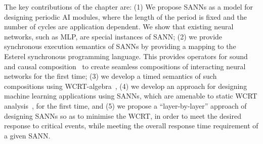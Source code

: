 The key contributions of the chapter are: (1) We propose \acfp{SANN} as a model for designing periodic 
AI modules, where the length of the period is fixed and the number of cycles are application dependent.
We show that existing neural networks, such as \ac{MLP}, are special instances of \ac{SANN};
(2) we provide synchronous execution semantics of \acp{SANN} by providing a mapping to the 
Esterel synchronous programming language. This provides operators for sound and causal composition~\cite{benveniste2003synchronous} to 
create seamless compositions of interacting neural networks for the first time; (3) we develop a 
timed semantics of such compositions using \ac{WCRT}-algebra~\cite{wang2017timing}, (4) we
 develop an approach for designing machine learning applications using \acp{SANN}, which are amenable to
  static \acf{WCRT} analysis~\cite{roop2009tight}, for the first time, and (5) we propose a ``layer-by-layer'' approach of 
 designing \acp{SANN} so as to minimise the \ac{WCRT}, in order to meet the desired response to 
critical events, while meeting the overall response time requirement of a given \ac{SANN}. 



